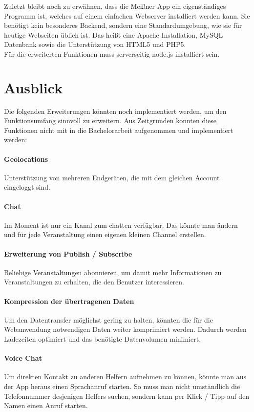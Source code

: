 Zuletzt bleibt noch zu erwähnen, dass die Meißner App ein eigenständiges Programm ist, welches auf einem einfachen Webserver installiert werden kann. Sie benötigt kein besonderes Backend, sondern eine Standardumgebung, wie sie für heutige Webseiten üblich ist. Das heißt eine Apache Installation, MySQL Datenbank sowie die Unterstützung von HTML5 und PHP5.\\
Für die erweiterten Funktionen muss serverseitig node.js installiert sein.



\section{Ausblick}
Die folgenden Erweiterungen könnten noch implementiert werden, um den Funktionsumfang sinnvoll zu erweitern. Aus Zeitgründen konnten diese Funktionen nicht mit in die Bachelorarbeit aufgenommen und implementiert werden:

\paragraph{Geolocations}
Unterstützung von mehreren Endgeräten, die mit dem gleichen Account eingeloggt sind.

\paragraph{Chat}
Im Moment ist nur ein Kanal zum chatten verfügbar. Das könnte man ändern und für jede Veranstaltung einen eigenen kleinen Channel erstellen.

\paragraph{Erweiterung von Publish / Subscribe}
Beliebige Veranstaltungen abonnieren, um damit mehr Informationen zu Veranstaltungen zu erhalten, die den Benutzer interessieren.

\paragraph{Kompression der übertragenen Daten}
Um den Datentransfer möglichst gering zu halten, könnten die für die Webanwendung notwendigen Daten weiter komprimiert werden. Dadurch werden Ladezeiten optimiert und das benötigte Datenvolumen minimiert.

\paragraph{Voice Chat}
Um direkten Kontakt zu anderen Helfern aufnehmen zu können, könnte man aus der App heraus einen Sprachanruf starten. So muss man nicht umständlich die Telefonnummer desjenigen Helfers suchen, sondern kann per Klick / Tipp auf den Namen einen Anruf starten.



